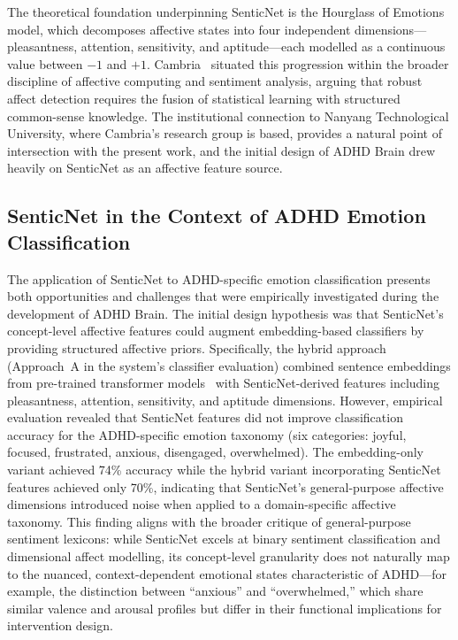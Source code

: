 The theoretical foundation underpinning SenticNet is the Hourglass of Emotions model, which decomposes affective states into four independent dimensions---pleasantness, attention, sensitivity, and aptitude---each modelled as a continuous value between $-1$ and $+1$. Cambria~\cite{cambria2016} situated this progression within the broader discipline of affective computing and sentiment analysis, arguing that robust affect detection requires the fusion of statistical learning with structured common-sense knowledge. The institutional connection to Nanyang Technological University, where Cambria's research group is based, provides a natural point of intersection with the present work, and the initial design of ADHD Brain drew heavily on SenticNet as an affective feature source.

\subsection{SenticNet in the Context of ADHD Emotion Classification}
\label{sec:litrev_senticnet_adhd}

The application of SenticNet to ADHD-specific emotion classification presents both opportunities and challenges that were empirically investigated during the development of ADHD Brain. The initial design hypothesis was that SenticNet's concept-level affective features could augment embedding-based classifiers by providing structured affective priors. Specifically, the hybrid approach (Approach~A in the system's classifier evaluation) combined sentence embeddings from pre-trained transformer models~\cite{reimers2019, wang2020} with SenticNet-derived features including pleasantness, attention, sensitivity, and aptitude dimensions. However, empirical evaluation revealed that SenticNet features did not improve classification accuracy for the ADHD-specific emotion taxonomy (six categories: joyful, focused, frustrated, anxious, disengaged, overwhelmed). The embedding-only variant achieved 74\% accuracy while the hybrid variant incorporating SenticNet features achieved only 70\%, indicating that SenticNet's general-purpose affective dimensions introduced noise when applied to a domain-specific affective taxonomy. This finding aligns with the broader critique of general-purpose sentiment lexicons: while SenticNet excels at binary sentiment classification and dimensional affect modelling, its concept-level granularity does not naturally map to the nuanced, context-dependent emotional states characteristic of ADHD---for example, the distinction between ``anxious'' and ``overwhelmed,'' which share similar valence and arousal profiles but differ in their functional implications for intervention design.

